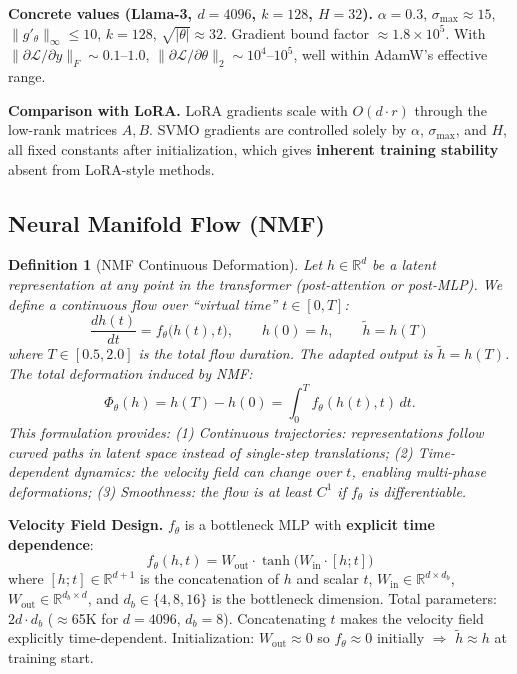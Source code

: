 \documentclass{scpe}
\newtheorem{definition}[theorem]{Definition}
\newcommand{\nmf}{\textsc{NMF}}
\newcommand{\RR}{\mathbb{R}}
\begin{document}
\textbf{Concrete values (Llama-3, $d{=}4096$, $k{=}128$, $H{=}32$).}
$\alpha = 0.3$, $\sigma_{\max} \approx 15$, $\|g'_\theta\|_\infty \leq 10$, $k{=}128$, $\sqrt{|\theta|} \approx 32$. Gradient bound factor $\approx 1.8\times 10^5$. With $\|\partial\mathcal{L}/\partial y\|_F \sim 0.1$--$1.0$, $\|\partial\mathcal{L}/\partial\theta\|_2 \sim 10^4$--$10^5$, well within AdamW's effective range.

\textbf{Comparison with LoRA.} LoRA gradients scale with $O(d \cdot r)$ through the low-rank matrices $A,B$. SVMO gradients are controlled solely by $\alpha$, $\sigma_{\max}$, and $H$, all fixed constants after initialization, which gives \textbf{inherent training stability} absent from LoRA-style methods.

\subsection{Neural Manifold Flow (\nmf)}

\begin{definition}[\nmf{} Continuous Deformation]
Let $h \in \RR^d$ be a latent representation at any point in the transformer (post-attention or post-MLP). We define a continuous flow over ``virtual time'' $t \in [0,T]$:
\begin{equation}
\frac{dh(t)}{dt} = f_\theta\big(h(t), t\big), \qquad h(0) = h, \qquad \tilde{h} = h(T)
\end{equation}
where $T \in [0.5, 2.0]$ is the total flow duration. The adapted output is $\tilde{h} = h(T)$. The total deformation induced by NMF:
\begin{equation}
\Phi_\theta(h) = h(T) - h(0) = \int_0^T f_\theta(h(t), t)\,dt.
\end{equation}
This formulation provides: (1) \textit{Continuous trajectories}: representations follow curved paths in latent space instead of single-step translations; (2) \textit{Time-dependent dynamics}: the velocity field can change over $t$, enabling multi-phase deformations; (3) \textit{Smoothness}: the flow is at least $C^1$ if $f_\theta$ is differentiable.
\end{definition}

\textbf{Velocity Field Design.} $f_\theta$ is a bottleneck MLP with \textbf{explicit time dependence}:
\begin{equation}
f_\theta(h, t) = W_{\text{out}} \cdot \tanh\!\big(W_{\text{in}} \cdot [h; t]\big)
\end{equation}
where $[h; t] \in \RR^{d+1}$ is the concatenation of $h$ and scalar $t$, $W_{\text{in}} \in \RR^{d \times d_b}$, $W_{\text{out}} \in \RR^{d_b \times d}$, and $d_b \in \{4, 8, 16\}$ is the bottleneck dimension. Total parameters: $2d \cdot d_b$ ($\approx$65K for $d=4096$, $d_b=8$). Concatenating $t$ makes the velocity field explicitly time-dependent. Initialization: $W_{\text{out}} \approx 0$ so $f_\theta \approx 0$ initially $\Rightarrow$ $\tilde{h} \approx h$ at training start.
\end{document}
